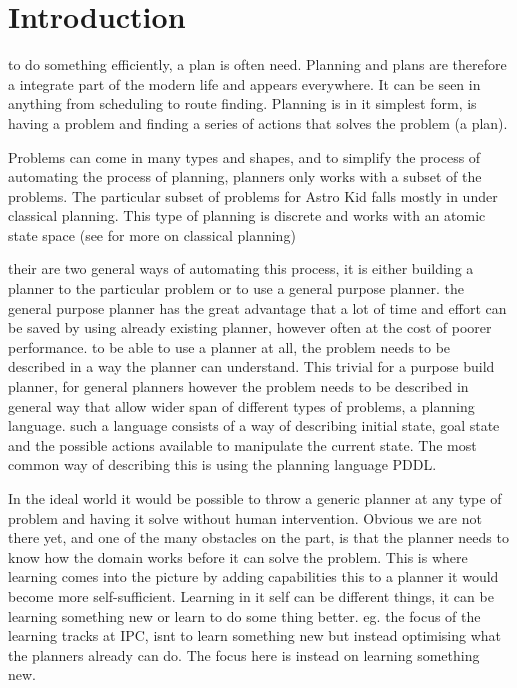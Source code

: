 \section{Introduction}	
	
	to do something efficiently, a plan is often need. Planning and plans are therefore a integrate part of the modern life and appears everywhere. It can be seen in anything from scheduling to route finding. Planning is in it simplest form, is having a problem and finding a series of actions that solves the problem (a plan). 
	
	Problems can come in many types and shapes, and to simplify the process of automating the process of planning, planners only works with a subset of the problems. The particular subset of problems for Astro Kid falls mostly in under classical planning. This type of planning is discrete and works with an atomic state space (see \cite{russell2014a} for more on classical planning)
	
	
	
	their are two general ways of automating this process, it is either building a planner to the particular problem or to use a general purpose planner. 
	the general purpose planner has the great advantage that a lot of time and effort can be saved by using already existing planner, however often at the cost of poorer performance.
	to be able to use a planner at all, the problem needs to be described in a way the planner can understand. This trivial for a purpose build planner, for general planners however the problem needs to be described in general way that allow wider span of different types of problems, a planning language. such a language consists of a way of describing initial state, goal state and the possible actions available to manipulate the current state. The most common way of describing this is using the planning language PDDL. 
	

%



In the ideal world it would be possible to throw a generic planner at any type of problem and having it solve without human intervention. Obvious we are not there yet, and one of the many obstacles on the part, is that the planner needs to know how the domain works before it can solve the problem. This is where learning comes into the picture by adding capabilities this to a planner it would become more self-sufficient. Learning in it self can be different things, it can be learning something new or learn to do some thing better. eg. the focus of the learning tracks at IPC, isnt to learn something new but instead optimising what the planners already can do. The focus here is instead on learning something new. %




